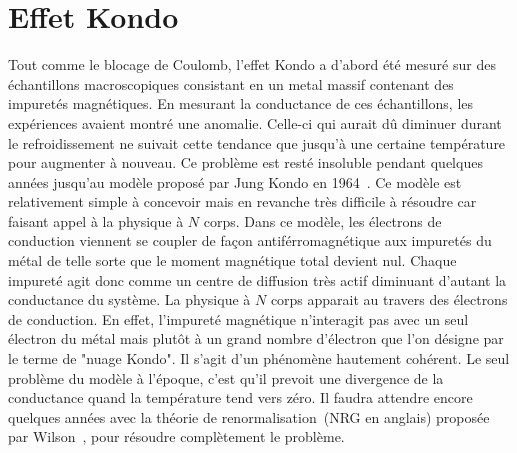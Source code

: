 

\section{Effet Kondo}

Tout comme le blocage de Coulomb, l'effet Kondo a d'abord été mesuré sur des échantillons macroscopiques consistant en un metal massif contenant des impuretés magnétiques. En mesurant la conductance de ces échantillons, les expériences avaient montré une anomalie. Celle-ci qui aurait d\^u diminuer durant le refroidissement ne suivait cette tendance que jusqu'à une certaine température pour augmenter à nouveau. Ce problème est resté insoluble pendant quelques années jusqu'au modèle proposé par Jung Kondo en 1964~\cite{JKondo1}. Ce modèle est relativement simple à concevoir mais en revanche très difficile à résoudre car faisant appel à la physique à $N$ corps. Dans ce modèle, les électrons de conduction viennent se coupler de façon antiférromagnétique aux impuretés du métal de telle sorte que le moment magnétique total devient nul. Chaque impureté agit donc comme un centre de diffusion très actif diminuant d'autant la conductance du système. La physique à $N$ corps apparait au travers des électrons de conduction. En effet, l'impureté magnétique n'interagit pas avec un seul électron du métal mais plutôt à un grand nombre d'électron que l'on désigne par le terme de "nuage Kondo". Il s'agit d'un phénomène hautement cohérent. Le seul problème du modèle à l'époque, c'est qu'il prevoit une divergence de la conductance quand la température tend vers zéro. Il faudra attendre encore quelques années avec la théorie de renormalisation~(NRG en anglais) proposée par Wilson~\cite{Wilson1975}, pour résoudre complètement le problème.

